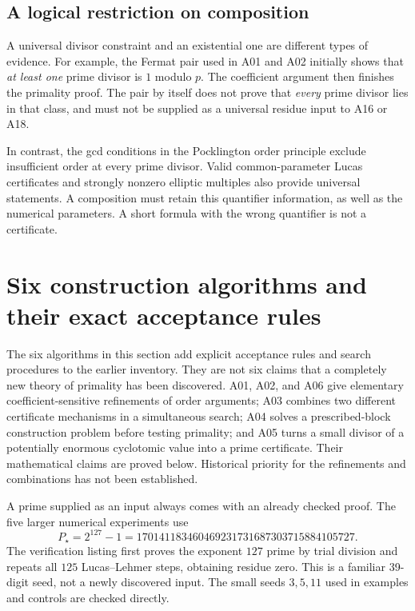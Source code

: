 \documentclass[11pt,a4paper]{article}
\theoremstyle{definition}\newtheorem{definition}[theorem]{Definition}
\theoremstyle{remark}\newtheorem{remark}[theorem]{Remark}
\begin{document}
\subsection{A logical restriction on composition}

A universal divisor constraint and an existential one are different types
of evidence. For example, the Fermat pair used in A01 and A02 initially
shows that \emph{at least one} prime divisor is $1$ modulo $p$. The
coefficient argument then finishes the primality proof. The pair by itself
does not prove that \emph{every} prime divisor lies in that class, and must
not be supplied as a universal residue input to A16 or A18.

In contrast, the gcd conditions in the Pocklington order principle exclude
insufficient order at every prime divisor. Valid common-parameter Lucas
certificates and strongly nonzero elliptic multiples also provide universal
statements. A composition must retain this quantifier information, as well
as the numerical parameters. A short formula with the wrong quantifier is
not a certificate.


\section{Six construction algorithms and their exact acceptance rules}
\label{sec:new-constructions}

The six algorithms in this section add explicit acceptance rules and search
procedures to the earlier inventory. They are not six claims that a completely
new theory of primality has been discovered. A01, A02, and A06 give elementary
coefficient-sensitive refinements of order arguments; A03 combines two
different certificate mechanisms in a simultaneous search; A04 solves a
prescribed-block construction problem before testing primality; and A05 turns
a small divisor of a potentially enormous cyclotomic value into a prime
certificate. Their mathematical claims are proved below. Historical priority
for the refinements and combinations has not been established.

A prime supplied as an input always comes with an already checked proof.
The five larger numerical experiments use
\begin{equation}\label{eq:new-common-seed}
 P_\star=2^{127}-1
 =170141183460469231731687303715884105727.
\end{equation}
The verification listing first proves the exponent $127$ prime by trial
division and repeats all $125$ Lucas--Lehmer steps, obtaining residue zero.
This is a familiar 39-digit seed, not a newly discovered input. The small
seeds $3,5,11$ used in examples and controls are checked directly.
\end{document}
